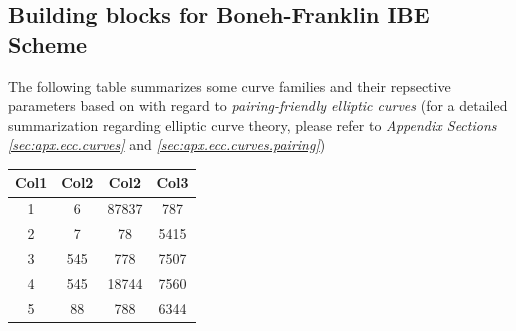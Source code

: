 

\subsection{Building blocks for Boneh-Franklin IBE Scheme}
 \label{ssec:ibe.bonehfranklin.scheme}



The following table summarizes some curve families and their repsective parameters
based on \cite{ecc.fam.param}  with regard to \textit{pairing-friendly elliptic curves}\cite{ecc.pairings.param}
(for a detailed summarization regarding elliptic curve theory,
please refer to \textit{Appendix Sections
\ref{sec:apx.ecc.curves}} and \textit{\ref{sec:apx.ecc.curves.pairing}})

%
\begin{table}[h!]
\centering
 \begin{tabular}{||c c c c||}
 \hline
 Col1 & Col2 & Col2 & Col3 \\ [0.5ex]
 \hline\hline
 1 & 6 & 87837 & 787 \\
 2 & 7 & 78 & 5415 \\
 3 & 545 & 778 & 7507 \\
 4 & 545 & 18744 & 7560 \\
 5 & 88 & 788 & 6344 \\ [1ex]
 \hline
 \end{tabular}
\end{table}




